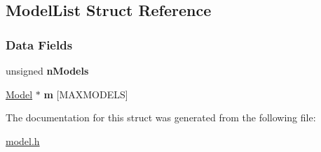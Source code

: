 \hypertarget{struct_model_list}{\subsection{Model\-List Struct Reference}
\label{struct_model_list}
}
\subsubsection*{Data Fields}
\begin{DoxyCompactItemize}
\item 
\hypertarget{struct_model_list_a58301ab01d8eef6ac4d0a486f89fcc08}{unsigned {\bfseries n\-Models}}\label{struct_model_list_a58301ab01d8eef6ac4d0a486f89fcc08}

\item 
\hypertarget{struct_model_list_a05ff4f000fae734e434a27b4fe016c82}{\hyperlink{struct_model}{Model} $\ast$ {\bfseries m} \mbox{[}M\-A\-X\-M\-O\-D\-E\-L\-S\mbox{]}}\label{struct_model_list_a05ff4f000fae734e434a27b4fe016c82}

\end{DoxyCompactItemize}


The documentation for this struct was generated from the following file\-:\begin{DoxyCompactItemize}
\item 
\hyperlink{model_8h}{model.\-h}\end{DoxyCompactItemize}
